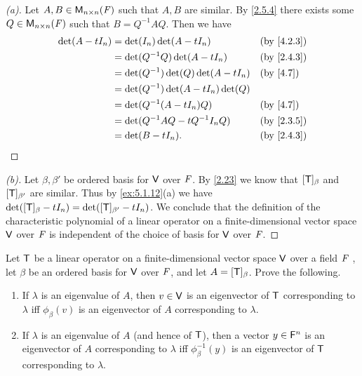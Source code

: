 \begin{proof}[(a)]
  Let \(A, B \in \mathsf{M}_{{n} \times n}({\mathit{F}})\) such that \(A, B\) are similar.
  By \cref{2.5.4} there exists some \(Q \in \mathsf{M}_{{n} \times n}({\mathit{F}})\) such that \(B = Q^{-1} A Q\).
  Then we have
  \begin{align*}
    \det(A - t I_n) & = \det(I_n) \det(A - t I_n)            &  & \text{(by \cref{4.2.3})} \\
                    & = \det(Q^{-1} Q) \det(A - t I_n)       &  & \text{(by \cref{2.4.3})} \\
                    & = \det(Q^{-1}) \det(Q) \det(A - t I_n) &  & \text{(by \cref{4.7})}   \\
                    & = \det(Q^{-1}) \det(A - t I_n) \det(Q)                               \\
                    & = \det(Q^{-1} (A - t I_n) Q)           &  & \text{(by \cref{4.7})}   \\
                    & = \det(Q^{-1} A Q - t Q^{-1} I_n Q)    &  & \text{(by \cref{2.3.5})} \\
                    & = \det(B - t I_n).                     &  & \text{(by \cref{2.4.3})}
  \end{align*}
\end{proof}

\begin{proof}[(b)]
  Let \(\beta, \beta'\) be ordered basis for \(\mathsf{V}\) over \(\mathit{F}\).
  By \cref{2.23} we know that \([\mathsf{T}]_{\beta}\) and \([\mathsf{T}]_{\beta'}\) are similar.
  Thus by \cref{ex:5.1.12}(a) we have \(\det([\mathsf{T}]_{\beta} - t I_n) = \det([\mathsf{T}]_{\beta'} - t I_n)\).
  We conclude that the definition of the characteristic polynomial of a linear operator on a finite-dimensional vector space \(\mathsf{V}\) over \(\mathit{F}\) is independent of the choice of basis for \(\mathsf{V}\) over \(\mathit{F}\).
\end{proof}

\begin{ex}\label{ex:5.1.13}
  Let \(\mathsf{T}\) be a linear operator on a finite-dimensional vector space \(\mathsf{V}\) over a field \(\mathit{F}\) , let \(\beta\) be an ordered basis for \(\mathsf{V}\) over \(\mathit{F}\), and let \(A = [\mathsf{T}]_{\beta}\).
  Prove the following.
  \begin{enumerate}
    \item If \(\lambda\) is an eigenvalue of \(A\), then \(v \in \mathsf{V}\) is an eigenvector of \(\mathsf{T}\) corresponding to \(\lambda\) iff \(\phi_{\beta}(v)\) is an eigenvector of \(A\) corresponding to \(\lambda\).
    \item If \(\lambda\) is an eigenvalue of \(A\) (and hence of \(\mathsf{T}\)), then a vector \(y \in \mathsf{F}^n\) is an eigenvector of \(A\) corresponding to \(\lambda\) iff \(\phi_{\beta}^{-1}(y)\) is an eigenvector of \(\mathsf{T}\) corresponding to \(\lambda\).
  \end{enumerate}
\end{ex}

